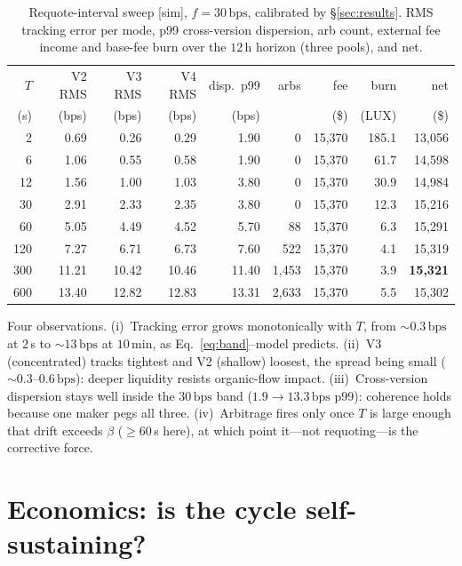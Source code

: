 \documentclass[11pt,a4paper]{article}
\newcommand{\bps}{\,\text{bps}}
\begin{document}
\begin{table}[h]
\centering
\caption{Requote-interval sweep [sim], $f{=}30\bps$, calibrated by \S\ref{sec:results}.
RMS tracking error per mode, p99 cross-version dispersion, arb count, external fee income
and base-fee burn over the $12$\,h horizon (three pools), and net.}
\label{tab:sweep}
\begin{tabular}{@{}rrrrrrrrr@{}}
\toprule
$T$ & V2 RMS & V3 RMS & V4 RMS & disp.\ p99 & arbs & fee & burn & net \\
(s) & (bps) & (bps) & (bps) & (bps) & & (\$) & (LUX) & (\$) \\
\midrule
2   & 0.69 & 0.26 & 0.29 & 1.90 & 0 & 15{,}370 & 185.1 & 13{,}056 \\
6   & 1.06 & 0.55 & 0.58 & 1.90 & 0 & 15{,}370 & 61.7 & 14{,}598 \\
12  & 1.56 & 1.00 & 1.03 & 3.80 & 0 & 15{,}370 & 30.9 & 14{,}984 \\
30  & 2.91 & 2.33 & 2.35 & 3.80 & 0 & 15{,}370 & 12.3 & 15{,}216 \\
60  & 5.05 & 4.49 & 4.52 & 5.70 & 88 & 15{,}370 & 6.3 & 15{,}291 \\
120 & 7.27 & 6.71 & 6.73 & 7.60 & 522 & 15{,}370 & 4.1 & 15{,}319 \\
300 & 11.21 & 10.42 & 10.46 & 11.40 & 1{,}453 & 15{,}370 & 3.9 & \textbf{15{,}321} \\
600 & 13.40 & 12.82 & 12.83 & 13.31 & 2{,}633 & 15{,}370 & 5.5 & 15{,}302 \\
\bottomrule
\end{tabular}
\end{table}

Four observations. (i)~Tracking error grows monotonically with $T$, from $\sim\!0.3\bps$
at $2$\,s to $\sim\!13\bps$ at $10$\,min, as Eq.~\eqref{eq:band}--model predicts.
(ii)~V3 (concentrated) tracks tightest and V2 (shallow) loosest, the spread being small
($\sim\!0.3$--$0.6\bps$): deeper liquidity resists organic-flow impact. (iii)~Cross-version
dispersion stays well inside the $30\bps$ band ($1.9\!\to\!13.3\bps$ p99): coherence holds
because one maker pegs all three. (iv)~Arbitrage fires only once $T$ is large enough that
drift exceeds $\beta$ ($\geq\!60$\,s here), at which point it---not requoting---is the
corrective force.

\section{Economics: is the cycle self-sustaining?}\label{sec:econ}
\end{document}
